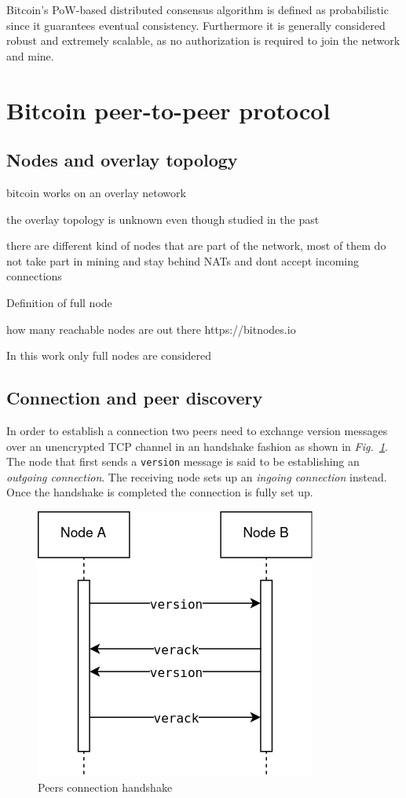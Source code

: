 \documentclass[12pt, letterpaper, twoside]{article}
\begin{document}
Bitcoin's PoW-based distributed consensus algorithm is defined as probabilistic since it guarantees eventual consistency. Furthermore it is generally considered robust and extremely scalable, as no authorization is required to join the network and mine.


\section{Bitcoin peer-to-peer protocol}\label{sec:netintro}

\subsection{Nodes and overlay topology}\label{sec:overlay}

bitcoin works on an overlay netowork

the overlay topology is unknown even though studied in the past

there are different kind of nodes that are part of the network, most of them do not take part in mining and stay behind NATs and dont accept incoming connections

Definition of full node

how many reachable nodes are out there https://bitnodes.io

In this work only full nodes are considered


\subsection{Connection and peer discovery}\label{sec:peerdisc}
In order to establish a connection two peers need to exchange version messages over an unencrypted TCP channel in an handshake fashion as shown in \emph{Fig.~\ref{fig:btcconn}}. The node that first sends a \texttt{version} message is said to be establishing an \emph{outgoing connection}. The receiving node sets up an \emph{ingoing connection} instead. Once the handshake is completed the connection is fully set up.

\begin{figure}[h]
	\includegraphics[width=.45\textwidth]{pict/BTCconnection.png}
	\centering
	\caption{Peers connection handshake}
	\label{fig:btcconn}
\end{figure}
\end{document}

